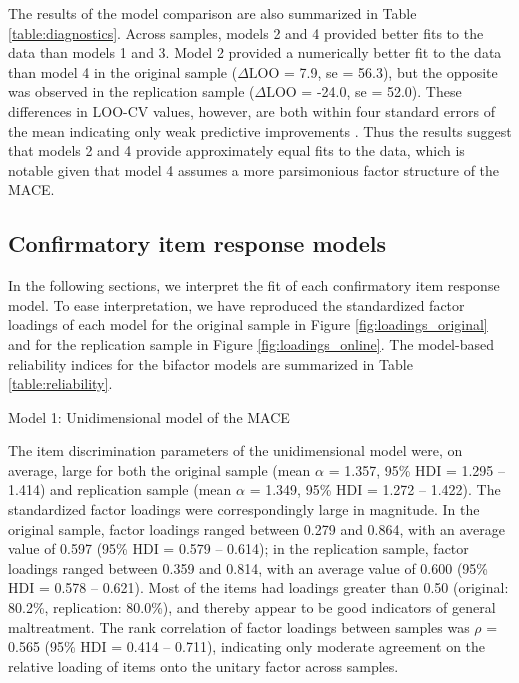 \documentclass[letterpaper,man,natbib]{apa6}  %
\makeatletter
\renewcommand{\subsubsection}{\@startsection{subsubsection}{3}
  {\z@}%
  {\b@level@two@skip}{\e@level@two@skip}%
  {\normalfont\normalsize\bfseries}}
\makeatother
\begin{document}
The results of the model comparison are also summarized in Table \ref{table:diagnostics}. Across samples, models 2 and 4 provided better fits to the data than models 1 and 3. Model 2 provided a numerically better fit to the data than model 4 in the original sample ($\Delta \text{LOO}$ = 7.9, se = 56.3), but the opposite was observed in the replication sample ($\Delta \text{LOO}$ = -24.0, se = 52.0). These differences in LOO-CV values, however, are both within four standard errors of the mean indicating only weak predictive improvements \citep{vehtari2022cv}. Thus the results suggest that models 2 and 4 provide approximately equal fits to the data, which is notable given that model 4 assumes a more parsimonious factor structure of the MACE.

\subsection{Confirmatory item response models}

In the following sections, we interpret the fit of each confirmatory item response model. To ease interpretation, we have reproduced the standardized factor loadings of each model for the original sample in Figure \ref{fig:loadings_original} and for the replication sample in Figure \ref{fig:loadings_online}. The model-based reliability indices for the bifactor models are summarized in Table \ref{table:reliability}. 

\subsubsection{Model 1: Unidimensional model of the MACE}

The item discrimination parameters of the unidimensional model were, on average, large for both the original sample (mean $\alpha$ = 1.357, 95\% HDI = 1.295 -- 1.414) and replication sample (mean $\alpha$ = 1.349, 95\% HDI = 1.272 -- 1.422). The standardized factor loadings were correspondingly large in magnitude. In the original sample, factor loadings ranged between 0.279 and 0.864, with an average value of 0.597 (95\% HDI = 0.579 -- 0.614); in the replication sample, factor loadings ranged between 0.359 and 0.814, with an average value of 0.600 (95\% HDI = 0.578 -- 0.621). Most of the items had loadings greater than 0.50 (original: 80.2\%, replication: 80.0\%), and thereby appear to be good indicators of general maltreatment. The rank correlation of factor loadings between samples was $\rho$ = 0.565 (95\% HDI = 0.414 -- 0.711), indicating only moderate agreement on the relative loading of items onto the unitary factor across samples. 
\end{document}
